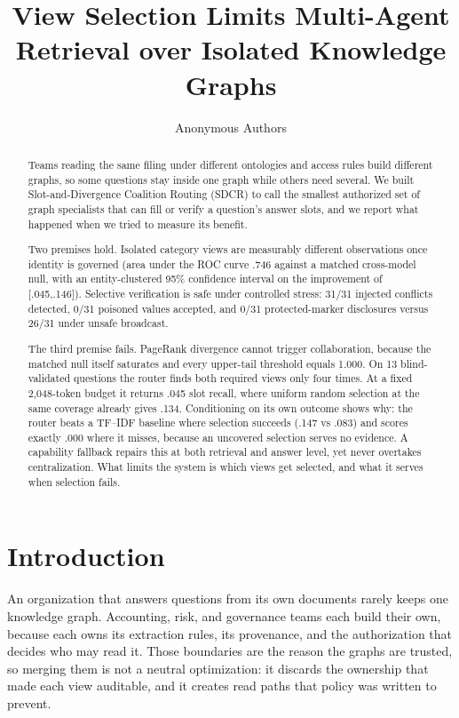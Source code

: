 \documentclass{article}
\title[View Selection Limits Multi-Agent Graph Retrieval]{View Selection Limits Multi-Agent Retrieval over Isolated Knowledge Graphs}
\author[Anonymous Authors]{Anonymous Authors}
\begin{document}
\maketitle

\begin{abstract}
Teams reading the same filing under different ontologies and access rules build different graphs, so some questions stay inside one graph while others need several. We built Slot-and-Divergence Coalition Routing (SDCR) to call the smallest authorized set of graph specialists that can fill or verify a question's answer slots, and we report what happened when we tried to measure its benefit.

Two premises hold. Isolated category views are measurably different observations once identity is governed (area under the ROC curve .746 against a matched cross-model null, with an entity-clustered 95\% confidence interval on the improvement of [.045,.146]). Selective verification is safe under controlled stress: 31/31 injected conflicts detected, 0/31 poisoned values accepted, and 0/31 protected-marker disclosures versus 26/31 under unsafe broadcast.

The third premise fails. PageRank divergence cannot trigger collaboration, because the matched null itself saturates and every upper-tail threshold equals 1.000. On 13 blind-validated questions the router finds both required views only four times. At a fixed 2{,}048-token budget it returns .045 slot recall, where uniform random selection at the same coverage already gives .134. Conditioning on its own outcome shows why: the router beats a TF--IDF baseline where selection succeeds (.147 vs .083) and scores exactly .000 where it misses, because an uncovered selection serves no evidence. A capability fallback repairs this at both retrieval and answer level, yet never overtakes centralization. What limits the system is which views get selected, and what it serves when selection fails.
\end{abstract}

\section{Introduction}
An organization that answers questions from its own documents rarely keeps one
knowledge graph. Accounting, risk, and governance teams each build their own,
because each owns its extraction rules, its provenance, and the authorization
that decides who may read it. Those boundaries are the reason the graphs are
trusted, so merging them is not a neutral optimization: it discards the
ownership that made each view auditable, and it creates read paths that policy
was written to prevent.
\end{document}
